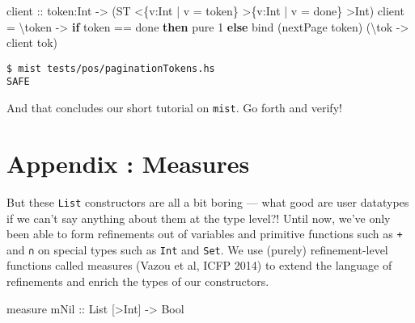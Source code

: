 \documentclass[
]{darts-v2021}
\newenvironment{Shaded}{}{}
\newcommand{\DataTypeTok}[1]{\textcolor[rgb]{0.56,0.13,0.00}{#1}}
\newcommand{\DecValTok}[1]{\textcolor[rgb]{0.25,0.63,0.44}{#1}}
\newcommand{\FunctionTok}[1]{\textcolor[rgb]{0.02,0.16,0.49}{#1}}
\newcommand{\KeywordTok}[1]{\textcolor[rgb]{0.00,0.44,0.13}{\textbf{#1}}}
\newcommand{\NormalTok}[1]{#1}
\newcommand{\OperatorTok}[1]{\textcolor[rgb]{0.40,0.40,0.40}{#1}}
\newcommand{\OtherTok}[1]{\textcolor[rgb]{0.00,0.44,0.13}{#1}}
\begin{document}
\begin{Shaded}
\begin{Highlighting}[numbers=left,,firstnumber=52,]
\OtherTok{client ::}\NormalTok{ token}\OperatorTok{:}\DataTypeTok{Int} \OtherTok{{-}\textgreater{}}
\NormalTok{  (}\DataTypeTok{ST} \OperatorTok{\textless{}}\NormalTok{\{v}\OperatorTok{:}\DataTypeTok{Int} \OperatorTok{|}\NormalTok{ v }\OtherTok{=}\NormalTok{ token\} }\OperatorTok{\textgreater{}}\NormalTok{\{v}\OperatorTok{:}\DataTypeTok{Int} \OperatorTok{|}\NormalTok{ v }\OtherTok{=}\NormalTok{ done\} }\OperatorTok{\textgreater{}}\DataTypeTok{Int}\NormalTok{)}
\NormalTok{client }\OtherTok{=}\NormalTok{ \textbackslash{}token }\OtherTok{{-}\textgreater{}}
  \KeywordTok{if}\NormalTok{ token }\OperatorTok{==}\NormalTok{ done}
  \KeywordTok{then} \FunctionTok{pure} \DecValTok{1}
  \KeywordTok{else}\NormalTok{ bind (nextPage token) (\textbackslash{}tok }\OtherTok{{-}\textgreater{}}\NormalTok{ client tok)}
\end{Highlighting}
\end{Shaded}

\begin{verbatim}
$ mist tests/pos/paginationTokens.hs
SAFE
\end{verbatim}

And that concludes our short tutorial on \texttt{mist}. Go forth and
verify!

\appendix

\hypertarget{appendix-measures}{%
\section{Appendix : Measures}\label{appendix-measures}}

But these \texttt{List} constructors are all a bit boring --- what good
are user datatypes if we can't say anything about them at the type
level?! Until now, we've only been able to form refinements out of
variables and primitive functions such as \texttt{+} and \texttt{∩} on
special types such as \texttt{Int} and \texttt{Set}. We use (purely)
refinement-level functions called measures (Vazou et al, ICFP 2014) to
extend the language of refinements and enrich the types of our
constructors.

\begin{Shaded}
\begin{Highlighting}[numbers=left,,]
\NormalTok{measure}\OtherTok{ mNil ::} \DataTypeTok{List}\NormalTok{ [}\OperatorTok{\textgreater{}}\DataTypeTok{Int}\NormalTok{] }\OtherTok{{-}\textgreater{}} \DataTypeTok{Bool}
\end{Highlighting}
\end{Shaded}
\end{document}
